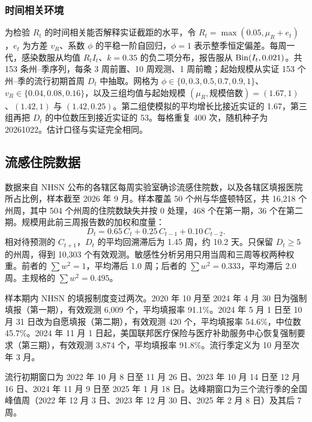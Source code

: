 \subsubsection{时间相关环境}

为检验 $R_t$ 的时间相关能否解释实证截距的水平，令 $R_t=\max(0.05,\mu_R+e_t)$，$e_t$ 为方差 $v_R$、系数 $\phi$ 的平稳一阶自回归，$\phi=1$ 表示整季恒定偏差。每周一代，感染数服从均值 $R_tI_t$、$k=0.35$ 的负二项分布，报告服从 $\operatorname{Bin}(I_t,0.021)$。共 153 条州--季序列，每条 3 周前置、10 周观测、1 周前瞻；起始规模从实证 153 个州--季的流行初期首周 $D_t$ 中抽取。网格为 $\phi\in\{0,0.3,0.5,0.7,0.9,1\}$、$v_R\in\{0.04,0.08,0.16\}$，以及三组均值与起始规模 $(\mu_R,\text{规模倍数})=(1.67,1)$、$(1.42,1)$ 与 $(1.42,0.25)$。第二组使模拟的平均增长比接近实证的 1.67，第三组再把 $D_t$ 的中位数压到接近实证的 53。每格重复 400 次，随机种子为 20261022。估计口径与实证完全相同。

\subsection{流感住院数据}
\label{sec:meth-data}

数据来自 NHSN 公布的各辖区每周实验室确诊流感住院数，以及各辖区填报医院所占比例\citep{cdc2026nhsn}，样本截至 2026 年 9 月。样本覆盖 50 个州与华盛顿特区，共 16,218 个州周，其中 504 个州周的住院数缺失并按 0 处理，468 个在第一期，36 个在第二期。规模用此前三周报告数的加权和度量：
\begin{equation}
  D_t=0.65\,C_t+0.25\,C_{t-1}+0.10\,C_{t-2}.
  \label{eq:dt}
\end{equation}
相对待预测的 $C_{t+1}$，$D_t$ 的平均回溯滞后为 1.45 周，约 10.2 天。只保留 $D_t\geq5$ 的州周，得到 10,303 个有效观测。敏感性分析另用只用当周和三周等权两种权重。前者的 $\sum w^2=1$，平均滞后 1.0 周；后者的 $\sum w^2=0.333$，平均滞后 2.0 周。主规格的 $\sum w^2=0.495$。

样本期内 NHSN 的填报制度变过两次。2020 年 10 月至 2024 年 4 月 30 日为强制填报（第一期），有效观测 6,009 个，平均填报率 91.1\%。2024 年 5 月 1 日至 10 月 31 日改为自愿填报（第二期），有效观测 420 个，平均填报率 54.6\%，中位数 45.7\%。2024 年 11 月 1 日起，美国联邦医疗保险与医疗补助服务中心恢复强制要求（第三期），有效观测 3,874 个，平均填报率 91.8\%。流行季定义为 10 月至次年 3 月。

流行初期窗口为 2022 年 10 月 8 日至 11 月 26 日、2023 年 10 月 14 日至 12 月 16 日、2024 年 11 月 9 日至 2025 年 1 月 18 日。达峰期窗口为三个流行季的全国峰值周（2022 年 12 月 3 日、2023 年 12 月 30 日、2025 年 2 月 8 日）及其后 7 周。

